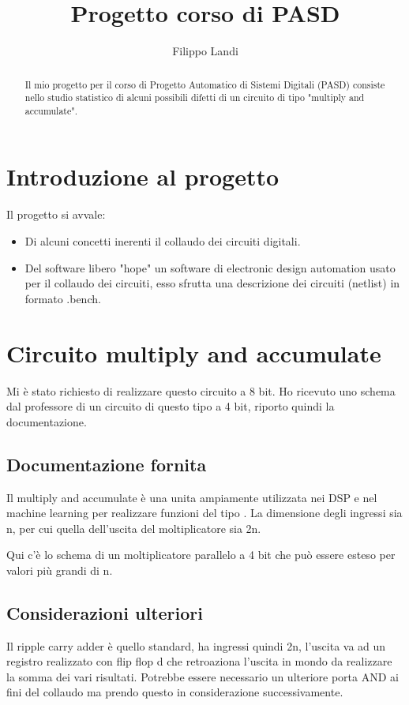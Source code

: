 \documentclass[12pt, letterpaper]{article}
\title{Progetto corso di PASD}
\author{Filippo Landi}
\begin{document}
\maketitle

\begin{abstract}
Il mio progetto per il corso di Progetto Automatico di Sistemi Digitali (PASD) consiste nello studio statistico di alcuni possibili difetti di un circuito di tipo "multiply and accumulate".
\end{abstract}

\section{Introduzione al progetto}
Il progetto si avvale: 
\begin{itemize}
\item Di alcuni concetti inerenti il collaudo dei circuiti digitali.
\item Del software libero "hope" un software di electronic design automation usato per il collaudo dei circuiti, esso sfrutta una descrizione dei circuiti (netlist) in formato .bench.
\end{itemize}


\section{Circuito multiply and accumulate}
Mi è stato richiesto di realizzare questo circuito a 8 bit.
Ho ricevuto uno schema dal professore di un circuito di questo tipo a 4 bit, riporto quindi la documentazione.
\subsection{Documentazione fornita}
Il multiply and accumulate è una unita ampiamente utilizzata nei DSP e nel machine learning per realizzare funzioni del tipo . La dimensione degli ingressi sia n, per cui quella dell'uscita del moltiplicatore sia 2n.

Qui c'è lo schema di un moltiplicatore parallelo a 4 bit che può essere esteso per valori più grandi di n.

\subsection{Considerazioni ulteriori}
Il ripple carry adder è quello standard, ha ingressi quindi 2n, l'uscita va ad un registro realizzato con flip flop d che retroaziona l'uscita in mondo da realizzare la somma dei vari risultati.
Potrebbe essere necessario un ulteriore porta AND ai fini del collaudo ma prendo questo in considerazione successivamente.
\end{document}
